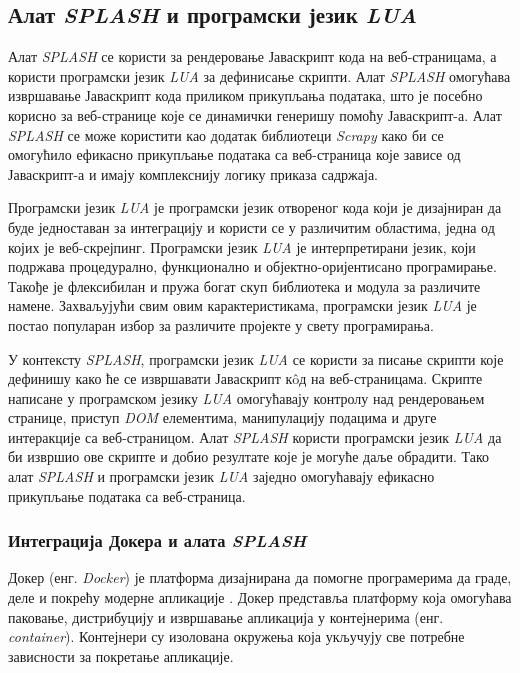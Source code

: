 \documentclass[12pt,oneside]{memoir}
\begin{document}
\subsection{Алат \textit{SPLASH} и програмски језик \textit{LUA}}
Алат \textit{SPLASH} се користи за рендеровање Јаваскрипт кода на веб-страницама, а користи програмски језик \textit{LUA} за дефинисање скрипти. Алат \textit{SPLASH} омогућава извршавање Јаваскрипт кода приликом прикупљања података, што је посебно корисно за веб-странице које се динамички генеришу помоћу Јаваскрипт-а. Алат \textit{SPLASH} се може користити као додатак библиотеци \textit{Scrapy} како би се омогућило ефикасно прикупљање података са веб-страница које зависе од Јаваскрипт-а и имају комплекснију логику приказа садржаја.

Програмски језик \textit{LUA} је програмски језик отвореног кода који је дизајниран да буде једноставан за интеграцију и користи се у различитим областима, једна од којих је веб-скрејпинг. Програмски језик \textit{LUA} је интерпретирани језик, који подржава процедурално, функционално и објектно-оријентисано програмирање. Такође је флексибилан и пружа богат скуп библиотека и модула за различите намене. Захваљујући свим овим карактеристикама, програмски језик \textit{LUA} је постао популаран избор за различите пројекте у свету програмирања.

У контексту \textit{SPLASH}, програмски језик \textit{LUA} се користи за писање скрипти које дефинишу како ће се извршавати Јаваскрипт кôд на веб-страницама. Скрипте написане у програмском језику \textit{LUA} омогућавају контролу над рендеровањем странице, приступ \textit{DOM} елементима, манипулацију подацима и друге интеракције са веб-страницом. Алат \textit{SPLASH} користи програмски језик \textit{LUA} да би извршио ове скрипте и добио резултате које је могуће даље обрадити. Тако алат \textit{SPLASH} и програмски језик \textit{LUA} заједно омогућавају ефикасно прикупљање података са веб-страница.

\subsubsection{Интеграција Докера и алата \textit{SPLASH}}
Докер (енг. \textit{Docker}) је платформа дизајнирана да помогне програмерима да граде, деле и покрећу модерне апликације \cite{docker}. Докер представља платформу која омогућава паковање, дистрибуцију и извршавање апликација у контејнерима (енг. \textit{container}). Контејнери су изолована окружења која укључују све потребне зависности за покретање апликације.
\end{document}

